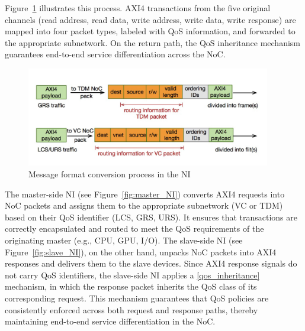 Figure~\ref{fig:message_format} illustrates this process. AXI4 transactions from the five original channels (read address, read data, write address, write data, write response) are mapped into four packet types, labeled with QoS information, and forwarded to the appropriate subnetwork. On the return path, the QoS inheritance mechanism guarantees end-to-end service differentiation across the NoC.

\begin{figure}[htbp]
    \centering
    \includegraphics[width=0.95\textwidth]{img/Message format conversion.png}
    \caption{Message format conversion process in the NI}
    \label{fig:message_format}
\end{figure}


The master-side NI (see Figure~\ref{fig:master_NI}) converts AXI4 requests into NoC packets and assigns them to the appropriate subnetwork (VC or TDM) based on their QoS identifier (LCS, GRS, URS). It ensures that transactions are correctly encapsulated and routed to meet the QoS requirements of the originating master (e.g., CPU, GPU, I/O).
The slave-side NI (see Figure~\ref{fig:slave_NI}), on the other hand, unpacks NoC packets into AXI4 responses and delivers them to the slave devices. Since AXI4 response signals do not carry QoS identifiers, the slave-side NI applies a \ref{qos_inheritance} mechanism, in which the response packet inherits the QoS class of its corresponding request. 
This mechanism guarantees that QoS policies are consistently enforced across both request and response paths, thereby maintaining end-to-end service differentiation in the NoC.

